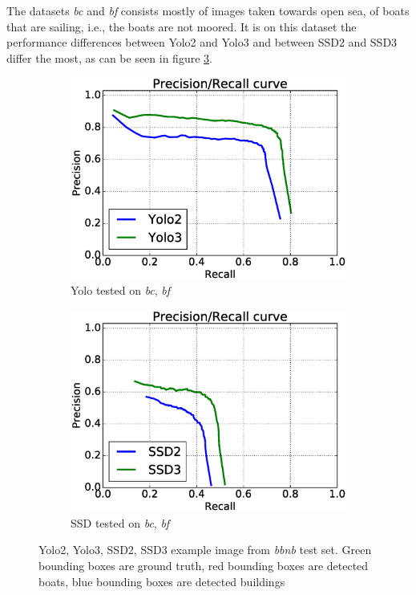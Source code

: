 The datasets \textit{bc} and \textit{bf} consists mostly of images taken towards open sea, of boats that are sailing, i.e., the boats are not moored. It is on this dataset the performance differences between Yolo2 and Yolo3 and between SSD2 and SSD3 differ the most, as can be seen in figure \ref{fig:bcbf_prec}.

\begin{figure}[h!]
\begin{subfigure}{.5\textwidth}
  \centering
  \includegraphics[width=0.8\linewidth]{results/case_buildings/prec_recall/yolo/bcbf.eps}
  \caption{Yolo tested on \textit{bc}, \textit{bf}}
  \label{fig:ex_bcbf_prec_rec_yolo}
\end{subfigure}%
\begin{subfigure}{.5\textwidth}
  \centering
  \includegraphics[width=.8\linewidth]{results/case_buildings/prec_recall/ssd/bcbf.eps}
  \caption{SSD tested on \textit{bc}, \textit{bf}}
  \label{fig:ex_bcbf_prec_rec_ssd}
\end{subfigure}
\caption{Yolo2, Yolo3, SSD2, SSD3 example image from \textit{bbnb} test set. Green bounding boxes are ground truth, red bounding boxes are detected boats, blue bounding boxes are detected buildings}
\label{fig:bcbf_prec}
\end{figure}

